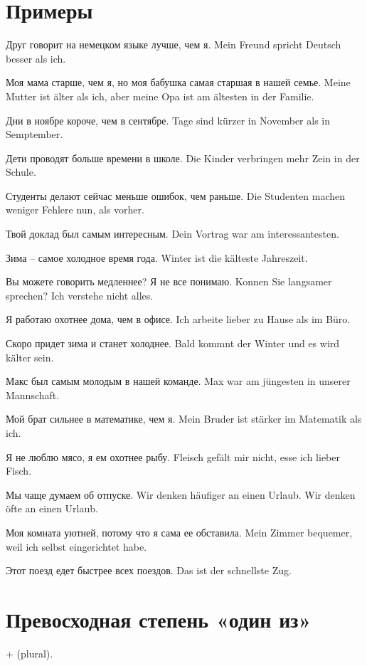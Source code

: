 \section{Примеры}

Друг говорит на немецком языке лучше, чем я.
Mein Freund spricht Deutsch besser als ich.

Моя мама старше, чем я, но моя бабушка самая старшая в нашей семье.
Meine Mutter ist älter als ich, aber meine Opa ist am ältesten in der Familie.

Дни в ноябре короче, чем в сентябре.
Tage sind kürzer in November als in Semptember.

Дети проводят больше времени в школе.
Die Kinder verbringen mehr Zein in der Schule.

Студенты делают сейчас меньше ошибок, чем раньше.
Die Studenten machen weniger Fehlere nun, als vorher.

Твой доклад был самым интересным.
Dein Vortrag war am interessantesten.

Зима -- самое холодное время года.
Winter ist die kälteste Jahreszeit.

Вы можете говорить медленнее? Я не все понимаю.
Konnen Sie langsamer sprechen? Ich verstehe nicht alles.

Я работаю охотнее дома, чем в офисе.
Ich arbeite lieber zu Hause als im Büro.

Скоро придет зима и станет холоднее.
Bald kommnt der Winter und es wird kälter sein.

Макс был самым молодым в нашей команде.
Max war am jüngesten in unserer Mannschaft.

Мой брат сильнее в математике, чем я.
Mein Bruder ist stärker im Matematik als ich.

Я не люблю мясо, я ем охотнее рыбу.
Fleisch gefält mir nicht, esse ich lieber Fisch.

Мы чаще думаем об отпуске.
Wir denken häufiger an einen Urlaub.
Wir denken öfte an einen Urlaub.

Моя комната уютней, потому что я сама ее обставила.
Mein Zimmer bequemer, weil ich selbst eingerichtet habe.

Этот поезд едет быстрее всех поездов.
Das ist der schnellste Zug.

\section{Превосходная степень «один из»}

 + \gen (plural).

